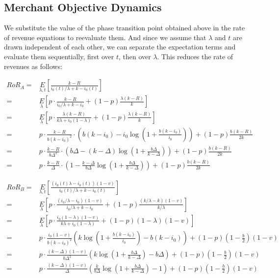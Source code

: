 \subsection{Merchant Objective Dynamics}
We substitute the value of the phase transition point obtained above in the rate of revenue equations to reevaluate them. 
And since we assume that $\lambda$ and $t$ are drawn independent of each other, we can separate the expectation terms and evaluate them sequentially, first over $t$, then over $\lambda$. This reduces the rate of revenues as follows:

\begin{align*}
RoR_A =& \underset{\lambda, t}E\left[\frac{k-R}{i_0(t)/\lambda + k - i_0(t)}\right]\\
                                       =& \underset{\lambda}E\left[p\cdot\frac{k-R}{i_0/\lambda + k - i_0} + (1-p)\frac{\lambda(k-R)}{k}\right]\\
                                       =& \underset{\lambda}E\left[p\cdot\frac{\lambda(k-R)}{k\lambda + i_0(1-\lambda)} + (1-p)\frac{\lambda(k-R)}{k}\right]\\
                                       =& p\cdot\frac{k-R}{b(k-i_0)^2}\cdot\left(b(k-i_0) - i_0 \log\left(1 + \frac{b(k-i_0)}{i_0}\right)\right) + (1-p)\frac{b(k-R)}{2k}\\
                                       =& p\cdot\frac{k-R}{b\Delta^2}\cdot\left(b\Delta - (k-\Delta)\log\left(1+\frac{b\Delta}{k-\Delta}\right)\right) + (1-p)\frac{b(k-R)}{2k}\\
                                       =& p\cdot\frac{k-R}{\Delta}\cdot\left(1 - \frac{k-\Delta}{b\Delta}\log\left(1+\frac{b\Delta}{k-\Delta}\right)\right) + (1-p)\frac{b(k-R)}{2k}
\end{align*}

\begin{align*}
RoR_B =& \underset{\lambda, t}E\left[\frac{(i_0(t)\lambda - i_0(t))(1-v)}{i_0(t)/\lambda + k - i_0(t)}\right]\\
                                     =& \underset{\lambda}E\left[p\cdot\frac{(i_0/\lambda - i_0)(1-v)}{i_0/\lambda + k - i_0} + (1-p)\frac{(k/\lambda - k)(1-v)}{k/\lambda}\right]\\
                                     =& \underset{\lambda}E\left[p\cdot\frac{i_0(1-\lambda)(1-v)}{k\lambda + i_0(1-\lambda)} + (1-p)(1-\lambda)(1-v)\right]\\
                                     =& p\cdot\frac{i_0(1-v)}{b(k-i_0)^2}\left(k\log\left(1+\frac{b(k-i_0)}{i_0}\right) - b(k-i_0)\right) + (1-p)(1-\frac{b}{2})(1-v)\\
                                     =& p\cdot\frac{(k-\Delta)(1-v)}{b\Delta^2}\left(k\log\left(1+\frac{b\Delta}{k-\Delta}\right) - b\Delta\right) + (1-p)(1-\frac{b}{2})(1-v)\\
                                     =& p\cdot\frac{(k-\Delta)(1-v)}{\Delta}\left(\frac{k}{b\Delta}\log\left(1+\frac{b\Delta}{k-\Delta}\right) - 1\right) + (1-p)(1-\frac{b}{2})(1-v)\label{eq:rorB_eval}
\end{align*}

